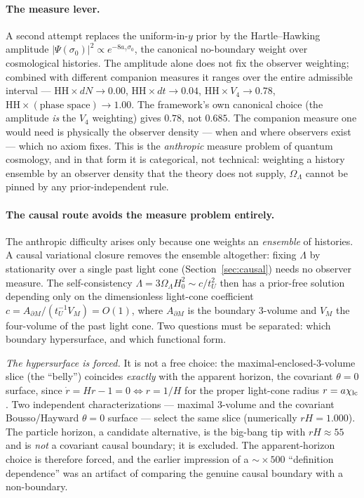 \documentclass[11pt,a4paper]{article}
\theoremstyle{plain}
\theoremstyle{definition}
\theoremstyle{remark}
\newcommand{\OL}{\Omega_\Lambda}
\newcommand{\ag}{a_\gamma}
\begin{document}
\paragraph{The measure lever.} A second attempt replaces the uniform-in-$y$ prior by the
Hartle--Hawking amplitude $|\Psi(\sigma_0)|^2 \propto e^{-8\ag\sigma_0}$, the canonical
no-boundary weight over cosmological histories. The amplitude alone does not fix the observer
weighting; combined with different companion measures it ranges over the entire admissible
interval --- $\text{HH}\times dN \to 0.00$, $\text{HH}\times dt \to 0.04$,
$\text{HH}\times V_4 \to 0.78$, $\text{HH}\times(\text{phase space}) \to 1.00$. The framework's
own canonical choice (the amplitude \emph{is} the $V_4$ weighting) gives $0.78$, not $0.685$. The
companion measure one would need is physically the observer density --- when and where observers
exist --- which no axiom fixes. This is the \emph{anthropic} measure problem of quantum
cosmology, and in that form it is categorical, not technical: weighting a history ensemble by an
observer density that the theory does not supply, $\OL$ cannot be pinned by any
prior-independent rule.

\paragraph{The causal route avoids the measure problem entirely.} The anthropic difficulty arises
only because one weights an \emph{ensemble} of histories. A causal variational closure removes the
ensemble altogether: fixing $\Lambda$ by stationarity over a single past light cone
(Section~\ref{sec:causal}) needs no observer measure. The self-consistency
$\Lambda = 3\OL H_0^2 \sim c/t_U^2$ then has a prior-free solution depending only on the
dimensionless light-cone coefficient $c = A_{\partial M}/(t_U^{-1}V_M) = O(1)$, where $A_{\partial
M}$ is the boundary $3$-volume and $V_M$ the four-volume of the past light cone. Two questions
must be separated: which boundary hypersurface, and which functional form.

\emph{The hypersurface is forced.} It is not a free choice: the maximal-enclosed-$3$-volume
slice (the ``belly'') coincides \emph{exactly} with the apparent horizon, the covariant
$\theta=0$ surface, since $\dot r = Hr-1 = 0 \Leftrightarrow r = 1/H$ for the proper light-cone
radius $r = a\chi_{\rm lc}$. Two independent characterizations --- maximal $3$-volume and the
covariant Bousso/Hayward $\theta=0$ surface --- select the same slice (numerically $r H = 1.000$).
The particle horizon, a candidate alternative, is the big-bang tip with $rH\approx 55$ and is
\emph{not} a covariant causal boundary; it is excluded. The apparent-horizon choice is therefore
forced, and the earlier impression of a $\sim\!\times 500$ ``definition dependence'' was an
artifact of comparing the genuine causal boundary with a non-boundary.
\end{document}
